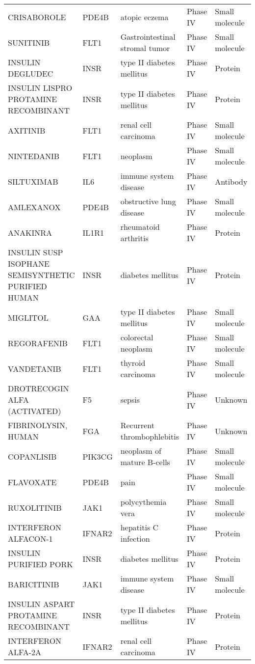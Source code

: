 \documentclass[fleqn,10pt]{SelfArx} %
\begin{document}
\begin{table}[ht]
\begin{tabularx}{\textwidth}{lXlll}
		CRISABOROLE & PDE4B & atopic eczema & Phase IV & Small molecule \\ 
		SUNITINIB & FLT1 & Gastrointestinal stromal tumor & Phase IV & Small molecule \\ 
		INSULIN DEGLUDEC & INSR & type II diabetes mellitus & Phase IV & Protein \\ 
		INSULIN LISPRO PROTAMINE RECOMBINANT & INSR & type II diabetes mellitus & Phase IV & Protein \\ 
		AXITINIB & FLT1 & renal cell carcinoma & Phase IV & Small molecule \\ 
		NINTEDANIB & FLT1 & neoplasm & Phase IV & Small molecule \\ 
		SILTUXIMAB & IL6 & immune system disease & Phase IV & Antibody \\ 
		AMLEXANOX & PDE4B & obstructive lung disease & Phase IV & Small molecule \\ 
		ANAKINRA & IL1R1 & rheumatoid arthritis & Phase IV & Protein \\ 
		INSULIN SUSP ISOPHANE SEMISYNTHETIC PURIFIED HUMAN & INSR & diabetes mellitus & Phase IV & Protein \\ 
		MIGLITOL & GAA & type II diabetes mellitus & Phase IV & Small molecule \\ 
		REGORAFENIB & FLT1 & colorectal neoplasm & Phase IV & Small molecule \\ 
		VANDETANIB & FLT1 & thyroid carcinoma & Phase IV & Small molecule \\ 
		DROTRECOGIN ALFA (ACTIVATED) & F5 & sepsis & Phase IV & Unknown \\ 
		FIBRINOLYSIN, HUMAN & FGA & Recurrent thrombophlebitis & Phase IV & Unknown \\ 
		COPANLISIB & PIK3CG & neoplasm of mature B-cells & Phase IV & Small molecule \\ 
		FLAVOXATE & PDE4B & pain & Phase IV & Small molecule \\ 
		RUXOLITINIB & JAK1 & polycythemia vera & Phase IV & Small molecule \\ 
		INTERFERON ALFACON-1 & IFNAR2 & hepatitis C infection & Phase IV & Protein \\ 
		INSULIN PURIFIED PORK & INSR & diabetes mellitus & Phase IV & Protein \\ 
		BARICITINIB & JAK1 & immune system disease & Phase IV & Small molecule \\ 
		INSULIN ASPART PROTAMINE RECOMBINANT & INSR & type II diabetes mellitus & Phase IV & Protein \\ 
		INTERFERON ALFA-2A & IFNAR2 & renal cell carcinoma & Phase IV & Protein \\ 

\end{tabularx}
\end{table}
\end{document}

